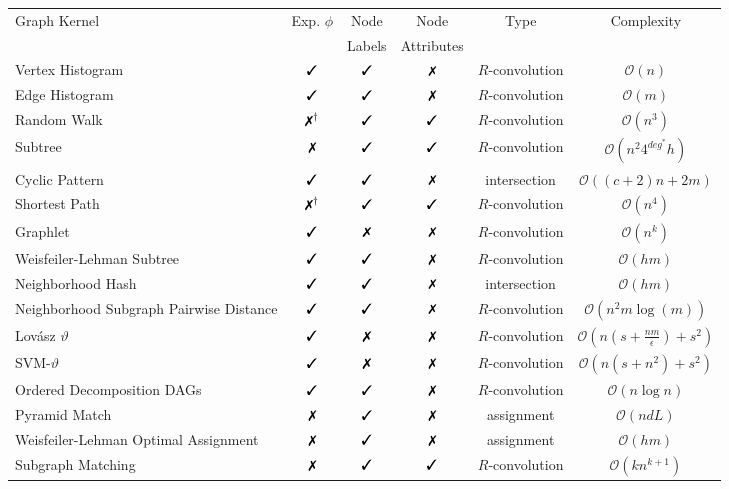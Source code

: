 \documentclass[twoside,11pt]{article}
\newcommand{\cmark}{\text{\ding{51}}}\newcommand{\xmark}{\text{\ding{55}}}
\begin{document}
\begin{table}[t]
  \centering
  \scriptsize
\def\arraystretch{1.2}
  \begin{tabular}{l|c|c|c|c|c}
    \multirow{2}{*}{Graph Kernel}& \multirow{2}{*}{Exp. $\phi$} & Node & Node & \multirow{2}{*}{Type} & \multirow{2}{*}{Complexity} \\ 
    & & Labels & Attributes & \\ \hline
    Vertex Histogram & $\cmark$ & $\cmark$ & $\xmark$ & $R$-convolution & $\mathcal{O}(n)$ \\ 
    Edge Histogram & $\cmark$ & $\cmark$ & $\xmark$ & $R$-convolution & $\mathcal{O}(m)$ \\ 
    Random Walk & $\xmark^{\dagger}$ & $\cmark$ & $\cmark$ & $R$-convolution & $\mathcal{O}(n^3)$ \\ 
    Subtree & $\xmark$ & $\cmark$ & $\cmark$ & $R$-convolution & $\mathcal{O}(n^2 4^{deg^*} h)$ \\ 
    Cyclic Pattern & $\cmark$ & $\cmark$ & $\xmark$ & intersection & $\mathcal{O}((c+2)n+2m)$ \\ 
    Shortest Path & $\xmark^{\dagger}$ & $\cmark$ & $\cmark$ & $R$-convolution  & $\mathcal{O}(n^4)$ \\ 
    Graphlet & $\cmark$ & $\xmark$ & $\xmark$ & $R$-convolution & $\mathcal{O}(n^k)$ \\ 
    Weisfeiler-Lehman Subtree & $\cmark$ & $\cmark$ & $\xmark$ & $R$-convolution & $\mathcal{O}(hm)$ \\ 
    Neighborhood Hash & $\cmark$ & $\cmark$ & $\xmark$ & intersection & $\mathcal{O}(hm)$ \\ 
    Neighborhood Subgraph Pairwise Distance & $\cmark$ & $\cmark$ & $\xmark$ & $R$-convolution & $\mathcal{O}(n^2 m \log(m))$ \\ 
    Lov\'asz $\vartheta$ & $\cmark$ & $\xmark$ & $\xmark$ & $R$-convolution & $\mathcal{O}(n(s+\frac{nm}{\epsilon})+s^2)$ \\ 
    SVM-$\vartheta$ & $\cmark$ & $\xmark$ & $\xmark$ & $R$-convolution & $\mathcal{O}(n(s+n^2)+s^2)$ \\ 
    Ordered Decomposition DAGs & $\cmark$ & $\cmark$ & $\xmark$ & $R$-convolution & $\mathcal{O}(n \log n)$ \\ 
    Pyramid Match & $\xmark$ & $\cmark$ & $\xmark$ & assignment & $\mathcal{O}(ndL)$ \\ 
    Weisfeiler-Lehman Optimal Assignment & $\xmark$ & $\cmark$ & $\xmark$ & assignment & $\mathcal{O}(hm)$ \\ 
    Subgraph Matching & $\xmark$ & $\cmark$ & $\cmark$ & $R$-convolution & $\mathcal{O}(kn^{k+1})$ \\ 

\end{tabular}
\end{table}
\end{document}
